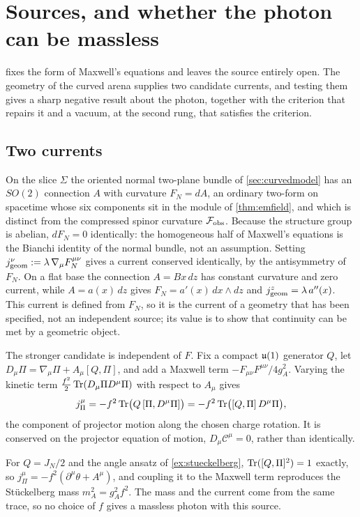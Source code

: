 \section{Sources, and whether the photon can be massless}
\label{sec:photon}

 fixes the form of Maxwell's equations and leaves the source entirely open. The geometry of the curved arena supplies two candidate
currents, and testing them gives a sharp negative result about the photon, together with the criterion that repairs it and a vacuum, at the second rung, that
satisfies the criterion.

\subsection{Two currents}

On the slice $\Sigma$ the oriented normal two-plane bundle of \cref{sec:curvedmodel} has an $SO(2)$ connection $A$ with curvature $F_N=dA$, an ordinary two-form
on spacetime whose six components sit in the module of \cref{thm:emfield}, and which is distinct from the compressed spinor curvature $\mathcal F_{\rm obs}$.
Because the structure group is abelian, $dF_N=0$ identically: the homogeneous half of Maxwell's equations is the Bianchi identity of the normal bundle, not an
assumption. Setting $j^\nu_{\rm geom}:=\lambda\,\nabla_\mu F_N^{\mu\nu}$ gives a current conserved identically, by the antisymmetry of $F_N$. On a flat base the
connection $A=Bx\,dz$ has constant curvature and zero current, while $A=a(x)\,dz$ gives $F_N=a'(x)\,dx\wedge dz$ and $j^z_{\rm geom}=\lambda\,a''(x)$. This current is
defined from $F_N$, so it is the current of a geometry that has been specified, not an independent source; its value is to show that continuity can be met by a
geometric object.

The stronger candidate is independent of $F$. Fix a compact $\mathfrak{u}(1)$ generator $Q$, let $D_\mu\Pi=\nabla_\mu\Pi+A_\mu[Q,\Pi]$, and add a Maxwell term
$-F_{\mu\nu}F^{\mu\nu}/4g_A^2$. Varying the kinetic term $\tfrac{f^2}2\operatorname{Tr}(D_\mu\Pi D^\mu\Pi)$ with respect to $A_\mu$ gives
\begin{equation}
\label{eq:jPi}
j^\mu_\Pi=-f^2\operatorname{Tr}\bigl(Q\,[\Pi,D^\mu\Pi]\bigr)=-f^2\operatorname{Tr}\bigl([Q,\Pi]\,D^\mu\Pi\bigr),
\end{equation}
the component of projector motion along the chosen charge rotation. It is conserved on the projector equation of motion, $D_\mu\mathcal C^\mu=0$, rather than
identically.

\begin{theorem}
\label{thm:photonmass}
For $Q=J_N/2$ and the angle ansatz of \cref{ex:stueckelberg}, $\operatorname{Tr}([Q,\Pi]^2)=1$ exactly, so $j^\mu_\Pi=-f^2(\partial^\mu\theta+A^\mu)$, and coupling it to the Maxwell term
reproduces the St\"uckelberg mass $m_A^2=g_A^2f^2$. The mass and the current come from the same trace, so no choice of $f$ gives a massless photon with this source.
\end{theorem}

